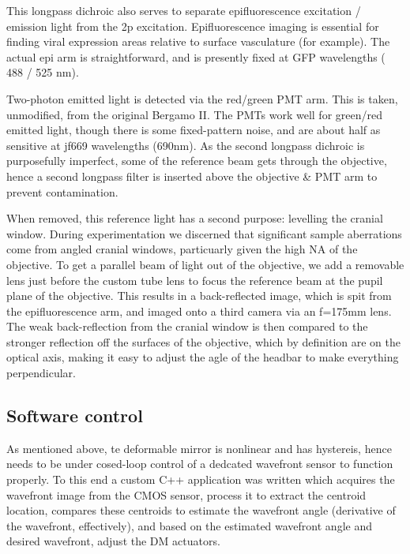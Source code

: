 \documentclass[a4paper,10pt]{article}
\begin{document}
This longpass dichroic also serves to separate epifluorescence excitation / emission light from the 2p excitation.  Epifluorescence imaging is essential for finding viral expression areas relative to surface vasculature (for example).  The actual epi arm is straightforward, and is presently fixed at GFP wavelengths ( 488 / 525 nm).  

Two-photon emitted light is detected via the red/green PMT arm.  This is taken, unmodified, from the original Bergamo II.  The PMTs work well for green/red emitted light, though there is some fixed-pattern noise, and are about half as sensitive at jf669 wavelengths (690nm).  As the second longpass dichroic is purposefully imperfect, some of the reference beam gets through the objective, hence a second longpass filter is inserted above the objective \& PMT arm to prevent contamination.  

When removed, this reference light has a second purpose: levelling the cranial window.  During experimentation we discerned that significant sample aberrations come from angled cranial windows, particuarly given the high NA of the objective.  To get a parallel beam of light out of the objective, we add a removable lens just before the custom tube lens to focus the reference beam at the pupil plane of the objective.  This results in a back-reflected image, which is spit from the epifluorescence arm, and imaged onto a third camera via an f=175mm lens.  The weak back-reflection from the cranial window is then compared to the stronger reflection off the surfaces of the objective, which by definition are on the optical axis, making it easy to adjust the agle of the headbar to make everything perpendicular.  

\subsection{Software control}

As mentioned above, te deformable mirror is nonlinear and has hystereis, hence needs to be under cosed-loop control of a dedcated wavefront sensor to function properly.  To this end a custom C++ application was written which acquires the wavefront image from the CMOS sensor, process it to extract the centroid location, compares these centroids to estimate the wavefront angle (derivative of the wavefront, effectively), and based on the estimated wavefront angle and desired wavefront, adjust the DM actuators.  
\end{document}
